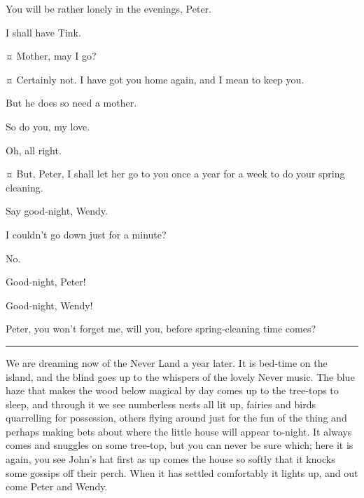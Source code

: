 \begin{drama}
\wendyspeaks
You will be rather lonely in the evenings, Peter.

\peterspeaks
I shall have Tink.

\wendyspeaks {}¤
Mother, may I go?

\mrsdarlingspeaks {}¤
Certainly not.
I have got you home again, and I mean to keep you.

\wendyspeaks
But he does so need a mother.

\mrsdarlingspeaks
So do you, my love.

\peterspeaks
Oh, all right.

\mrsdarlingspeaks {}¤
But, Peter, I shall let her go to you once a year for a week to do your spring cleaning.


\mrsdarlingspeaks
Say good‐night, Wendy.

\wendyspeaks
I couldn’t go down just for a minute?

\mrsdarlingspeaks
No.

\wendyspeaks
Good‐night, Peter!

\peterspeaks
Good‐night, Wendy!

\wendyspeaks
Peter, you won’t forget me, will you, before spring‐cleaning time comes?


\plainbreak{1}

\begin{stagedir}
We are dreaming now of the Never Land a year later.
It is bed‐time on the island, and the blind goes up to the whispers of the lovely Never music.
The blue haze that makes the wood below magical by day comes up to the tree‐tops to sleep,
and through it we see numberless nests all lit up, fairies and birds quarrelling for possession,
others flying around just for the fun of the thing
and perhaps making bets about where the little house will appear to‐night.
It always comes and snuggles on some tree‐top, but you can never be sure which;
here it is again, you see John’s hat first as up comes the house
so softly that it knocks some gossips off their perch.
When it has settled comfortably it lights up, and out come Peter and Wendy.


\end{stagedir}
\end{drama}
